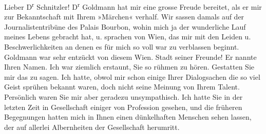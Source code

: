 \pstart{}Lieber D\textsuperscript{r} Schnitzler!\pend\vspace{0.5em}
\pstart
           D\textsuperscript{r}{ }Goldmann hat mir eine grosse Freude bereitet,
               als er mir zur Bekanntschaft mit Ihrem »Märchen«
               verhalf. Wir sassen damals auf der Journalistentribüne des Palais Bourbon, wohin mich ja der wunderliche Lauf meines
               Lebens gebracht hat, u. sprachen von Wien, das mir
               mit den Leiden u. Beschwerlichkeiten an denen es für mich so voll war zu verblassen
               beginnt. Goldmann war sehr entzückt von diesem
                  Wien. Stadt seiner Freunde! Er nannte Ihren
               Namen. Ich war ziemlich erstaunt, Sie so rühmen zu hören. Gestatten Sie mir das zu
               sagen. Ich hatte, obwol mir {\pb}schon
               einige Ihrer Dialogsachen die so viel Geist sprühen bekannt waren, doch nicht seine
               Meinung von Ihrem Talent. Persönlich waren Sie mir aber geradezu unsympathisch. Ich
               hatte Sie in der letzten Zeit in Gesellschaft einiger \label{K_L03823-1v}\label{K_L03823-1} von Profession gesehen, und die früheren Begegnungen hatten mich in Ihnen
               einen dünkelhaften Menschen sehen lassen, der auf allerlei Albernheiten der
               Gesellschaft herumritt.\pend
           

